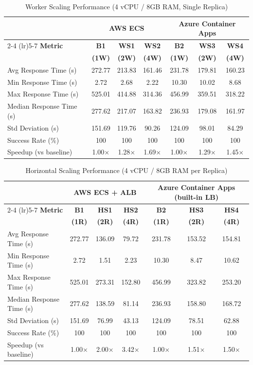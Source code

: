 \begin{table}[!htbp]
\centering
\caption{Worker Scaling Performance (4 vCPU / 8GB RAM, Single Replica)}
\label{tab:worker_scaling}
\begin{tabular}{lcccccc}
\toprule
& \multicolumn{3}{c}{\textbf{AWS ECS}} & \multicolumn{3}{c}{\textbf{Azure Container Apps}} \\
\cmidrule(lr){2-4} \cmidrule(lr){5-7}
\textbf{Metric} & \textbf{B1} & \textbf{WS1} & \textbf{WS2} & \textbf{B2} & \textbf{WS3} & \textbf{WS4} \\
& \textbf{(1W)} & \textbf{(2W)} & \textbf{(4W)} & \textbf{(1W)} & \textbf{(2W)} & \textbf{(4W)} \\
\midrule
Avg Response Time (s) & 272.77 & 213.83 & 161.46 & 231.78 & 179.81 & 160.23 \\
Min Response Time (s) & 2.72 & 2.68 & 2.22 & 10.30 & 10.02 & 8.68 \\
Max Response Time (s) & 525.01 & 414.88 & 314.36 & 456.99 & 359.51 & 318.22 \\
Median Response Time (s) & 277.62 & 217.07 & 163.82 & 236.93 & 179.08 & 161.97 \\
Std Deviation (s) & 151.69 & 119.76 & 90.26 & 124.09 & 98.01 & 84.29 \\
Success Rate (\%) & 100 & 100 & 100 & 100 & 100 & 100 \\
Speedup (vs baseline) & 1.00× & 1.28× & 1.69× & 1.00× & 1.29× & 1.45× \\
\bottomrule
\end{tabular}
\end{table}

\begin{table}[!htbp]
\centering
\caption{Horizontal Scaling Performance (4 vCPU / 8GB RAM per Replica)}
\label{tab:horizontal_scaling}
\begin{tabular}{lcccccc}
\toprule
& \multicolumn{3}{c}{\textbf{AWS ECS + ALB}} & \multicolumn{3}{c}{\textbf{Azure Container Apps (built-in LB)}} \\
\cmidrule(lr){2-4} \cmidrule(lr){5-7}
\textbf{Metric} & \textbf{B1} & \textbf{HS1} & \textbf{HS2} & \textbf{B2} & \textbf{HS3} & \textbf{HS4} \\
& \textbf{(1R)} & \textbf{(2R)} & \textbf{(4R)} & \textbf{(1R)} & \textbf{(2R)} & \textbf{(4R)} \\
\midrule
Avg Response Time (s) & 272.77 & 136.09 & 79.72 & 231.78 & 153.52 & 154.81 \\
Min Response Time (s) & 2.72 & 1.51 & 2.23 & 10.30 & 8.47 & 10.62 \\
Max Response Time (s) & 525.01 & 273.31 & 152.80 & 456.99 & 323.82 & 253.20 \\
Median Response Time (s) & 277.62 & 138.59 & 81.14 & 236.93 & 158.80 & 168.72 \\
Std Deviation (s) & 151.69 & 76.99 & 43.13 & 124.09 & 78.51 & 62.88 \\
Success Rate (\%) & 100 & 100 & 100 & 100 & 100 & 100 \\
Speedup (vs baseline) & 1.00× & 2.00× & 3.42× & 1.00× & 1.51× & 1.50× \\
\bottomrule
\end{tabular}
\end{table}

